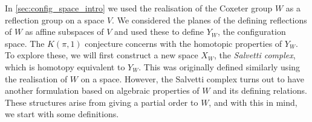 \documentclass[class=article, crop=false]{standalone}
\begin{document}
In \cref{sec:config_space_intro} we used the realisation of the Coxeter group $W$ as a reflection group on a space $V$. We considered the planes of the defining reflections of $W$ as affine subspaces of $V$ and used these to define $Y_W$, the configuration space. The $K(\pi,1)$ conjecture concerns with the homotopic properties of $Y_W$. To explore these, we will first construct a new space $X_W$, the \emph{Salvetti complex}, which is homotopy equivalent to $Y_W$. This was originally defined \cite{salvetti_topology_1987, salvetti_homotopy_1994} similarly using the realisation of $W$ on a space. However, the Salvetti complex turns out to have another formulation based on algebraic properties of $W$ and its defining relations. These structures arise from giving a partial order to $W$, and with this in mind, we start with some definitions. 
\end{document}
